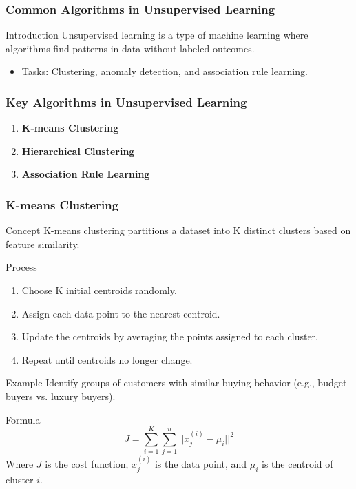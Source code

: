 \documentclass[aspectratio=169]{beamer}
\begin{document}
\begin{frame}[fragile]
    \frametitle{Common Algorithms in Unsupervised Learning}
    \begin{block}{Introduction}
        Unsupervised learning is a type of machine learning where algorithms find patterns in data without labeled outcomes.
    \end{block}
    \begin{itemize}
        \item Tasks: Clustering, anomaly detection, and association rule learning.
    \end{itemize}
\end{frame}

\begin{frame}[fragile]
    \frametitle{Key Algorithms in Unsupervised Learning}
    \begin{enumerate}
        \item \textbf{K-means Clustering}
        \item \textbf{Hierarchical Clustering}
        \item \textbf{Association Rule Learning}
    \end{enumerate}
\end{frame}

\begin{frame}[fragile]
    \frametitle{K-means Clustering}
    \begin{block}{Concept}
        K-means clustering partitions a dataset into K distinct clusters based on feature similarity.
    \end{block}
    \begin{block}{Process}
        \begin{enumerate}
            \item Choose K initial centroids randomly.
            \item Assign each data point to the nearest centroid.
            \item Update the centroids by averaging the points assigned to each cluster.
            \item Repeat until centroids no longer change.
        \end{enumerate}
    \end{block}
    \begin{block}{Example}
        Identify groups of customers with similar buying behavior (e.g., budget buyers vs. luxury buyers).
    \end{block}
    \begin{block}{Formula}
        \begin{equation}
            J = \sum_{i=1}^{K} \sum_{j=1}^{n} ||x_j^{(i)} - \mu_i||^2
        \end{equation}
        Where $J$ is the cost function, $x_j^{(i)}$ is the data point, and $\mu_i$ is the centroid of cluster $i$.
    \end{block}
\end{frame}
\end{document}
